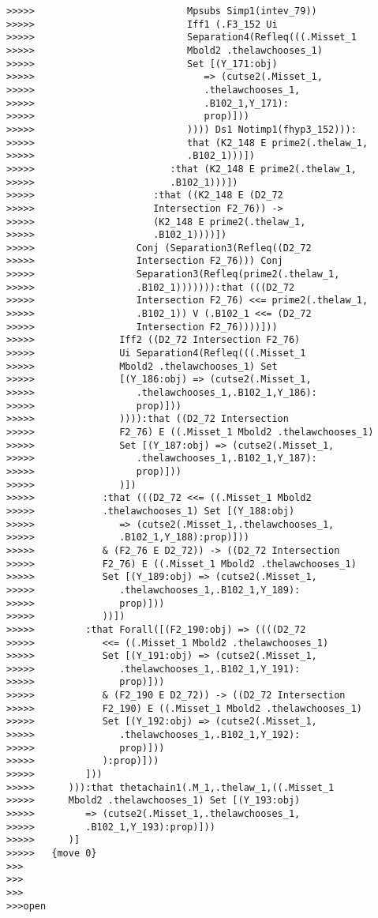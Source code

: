 \documentclass[12pt]{article}
\begin{document}
\begin{verbatim}
>>>>>                           Mpsubs Simp1(intev_79))
>>>>>                           Iff1 (.F3_152 Ui
>>>>>                           Separation4(Refleq(((.Misset_1
>>>>>                           Mbold2 .thelawchooses_1)
>>>>>                           Set [(Y_171:obj)
>>>>>                              => (cutse2(.Misset_1,
>>>>>                              .thelawchooses_1,
>>>>>                              .B102_1,Y_171):
>>>>>                              prop)]))
>>>>>                           )))) Ds1 Notimp1(fhyp3_152))):
>>>>>                           that (K2_148 E prime2(.thelaw_1,
>>>>>                           .B102_1)))])
>>>>>                        :that (K2_148 E prime2(.thelaw_1,
>>>>>                        .B102_1)))])
>>>>>                     :that ((K2_148 E (D2_72
>>>>>                     Intersection F2_76)) ->
>>>>>                     (K2_148 E prime2(.thelaw_1,
>>>>>                     .B102_1))))])
>>>>>                  Conj (Separation3(Refleq((D2_72
>>>>>                  Intersection F2_76))) Conj
>>>>>                  Separation3(Refleq(prime2(.thelaw_1,
>>>>>                  .B102_1))))))):that (((D2_72
>>>>>                  Intersection F2_76) <<= prime2(.thelaw_1,
>>>>>                  .B102_1)) V (.B102_1 <<= (D2_72
>>>>>                  Intersection F2_76))))]))
>>>>>               Iff2 ((D2_72 Intersection F2_76)
>>>>>               Ui Separation4(Refleq(((.Misset_1
>>>>>               Mbold2 .thelawchooses_1) Set
>>>>>               [(Y_186:obj) => (cutse2(.Misset_1,
>>>>>                  .thelawchooses_1,.B102_1,Y_186):
>>>>>                  prop)]))
>>>>>               )))):that ((D2_72 Intersection
>>>>>               F2_76) E ((.Misset_1 Mbold2 .thelawchooses_1)
>>>>>               Set [(Y_187:obj) => (cutse2(.Misset_1,
>>>>>                  .thelawchooses_1,.B102_1,Y_187):
>>>>>                  prop)]))
>>>>>               )])
>>>>>            :that (((D2_72 <<= ((.Misset_1 Mbold2
>>>>>            .thelawchooses_1) Set [(Y_188:obj)
>>>>>               => (cutse2(.Misset_1,.thelawchooses_1,
>>>>>               .B102_1,Y_188):prop)]))
>>>>>            & (F2_76 E D2_72)) -> ((D2_72 Intersection
>>>>>            F2_76) E ((.Misset_1 Mbold2 .thelawchooses_1)
>>>>>            Set [(Y_189:obj) => (cutse2(.Misset_1,
>>>>>               .thelawchooses_1,.B102_1,Y_189):
>>>>>               prop)]))
>>>>>            ))])
>>>>>         :that Forall([(F2_190:obj) => ((((D2_72
>>>>>            <<= ((.Misset_1 Mbold2 .thelawchooses_1)
>>>>>            Set [(Y_191:obj) => (cutse2(.Misset_1,
>>>>>               .thelawchooses_1,.B102_1,Y_191):
>>>>>               prop)]))
>>>>>            & (F2_190 E D2_72)) -> ((D2_72 Intersection
>>>>>            F2_190) E ((.Misset_1 Mbold2 .thelawchooses_1)
>>>>>            Set [(Y_192:obj) => (cutse2(.Misset_1,
>>>>>               .thelawchooses_1,.B102_1,Y_192):
>>>>>               prop)]))
>>>>>            ):prop)]))
>>>>>         ]))
>>>>>      ))):that thetachain1(.M_1,.thelaw_1,((.Misset_1
>>>>>      Mbold2 .thelawchooses_1) Set [(Y_193:obj)
>>>>>         => (cutse2(.Misset_1,.thelawchooses_1,
>>>>>         .B102_1,Y_193):prop)]))
>>>>>      )]
>>>>>   {move 0}
>>>
>>>
>>>
>>>open


\end{verbatim}
\end{document}
